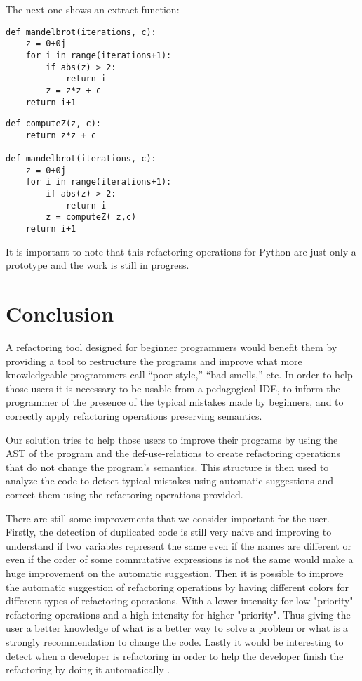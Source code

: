 \vspace{5mm}
The next one shows an extract function:
\begin{lstlisting}
def mandelbrot(iterations, c):
    z = 0+0j
    for i in range(iterations+1):
        if abs(z) > 2:
            return i
        z = z*z + c
    return i+1
\end{lstlisting}
\begin{absolutelynopagebreak}
\begin{lstlisting}
def computeZ(z, c):
    return z*z + c

def mandelbrot(iterations, c):
    z = 0+0j
    for i in range(iterations+1):
        if abs(z) > 2:
            return i
        z = computeZ( z,c)
    return i+1
\end{lstlisting}
\end{absolutelynopagebreak}
It is important to note that this refactoring operations for Python are just only a prototype and
the work is still in progress.
\section{Conclusion}
A refactoring tool designed for beginner programmers would benefit them
by providing a tool to restructure the programs and improve what more knowledgeable programmers call ``poor style,''
``bad smells,'' etc.
In order to help those users it is necessary to be usable from a pedagogical IDE,
to inform the programmer of the presence of the typical mistakes made by beginners, and
to correctly apply refactoring operations preserving semantics.

Our solution tries to help those users to improve their programs by using the AST of
the program and the def-use-relations to create refactoring operations that do not
change the program's semantics. This structure is then used to analyze the code
to detect typical mistakes using automatic suggestions and correct them using the
refactoring operations provided.


There are still some improvements that we consider important for the user.
Firstly, the detection of duplicated code is still very naive and improving to understand if
two variables represent the same even if the names are different or even if the
 order of some commutative expressions is not the same would make a huge improvement
 on the automatic suggestion.
Then it is possible to improve the automatic suggestion of refactoring operations by
having different colors for different types of refactoring operations.
With a lower intensity for low "priority" refactoring operations and a high intensity
for higher "priority". Thus giving the user a better knowledge of what is a better
way to solve a problem or what is a strongly recommendation to change the code.
Lastly it would be interesting to detect when a developer is refactoring in order to help the developer finish the
refactoring by doing it automatically \cite{ge2012reconciling}.
